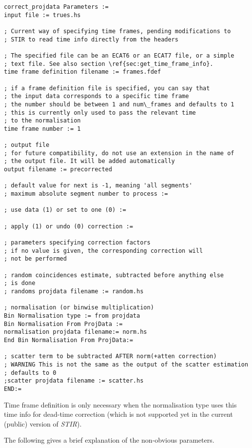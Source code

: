 \documentclass{article}
\begin{document}
\begin{verbatim}
correct_projdata Parameters := 
input file := trues.hs

; Current way of specifying time frames, pending modifications to
; STIR to read time info directly from the headers

; The specified file can be an ECAT6 or an ECAT7 file, or a simple
; text file. See also section \ref{sec:get_time_frame_info}. 
time frame definition filename := frames.fdef

; if a frame definition file is specified, you can say that 
; the input data corresponds to a specific time frame
; the number should be between 1 and num\_frames and defaults to 1
; this is currently only used to pass the relevant time 
; to the normalisation 
time frame number := 1

; output file
; for future compatibility, do not use an extension in the name of 
; the output file. It will be added automatically 
output filename := precorrected

; default value for next is -1, meaning 'all segments' 
; maximum absolute segment number to process :=  

; use data (1) or set to one (0) := 

; apply (1) or undo (0) correction := 

; parameters specifying correction factors 
; if no value is given, the corresponding correction will
; not be performed

; random coincidences estimate, subtracted before anything else 
; is done
; randoms projdata filename := random.hs 

; normalisation (or binwise multiplication) 
Bin Normalisation type := from projdata 
Bin Normalisation From ProjData := 
normalisation projdata filename:= norm.hs 
End Bin Normalisation From ProjData:=

; scatter term to be subtracted AFTER norm(+atten correction)
; WARNING This is not the same as the output of the scatter estimation
; defaults to 0 
;scatter projdata filename := scatter.hs
END:=
\end{verbatim}


Time frame definition is only necessary when the normalisation 
type uses this time info for dead-time correction (which is not 
supported yet in the current (public) version of \textit{STIR}).


The following gives a brief explanation of the non-obvious parameters. 
\end{document}
